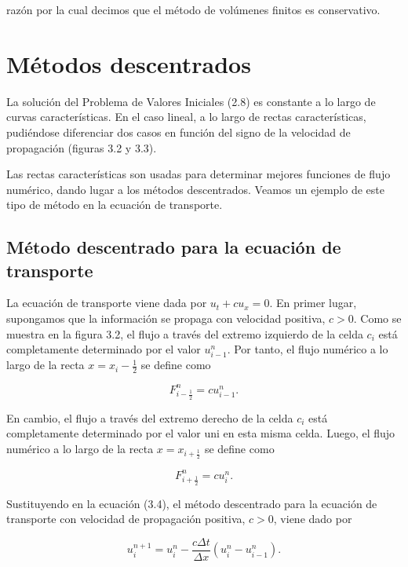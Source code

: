 razón por la cual decimos que el método de volúmenes finitos es
conservativo.

\section{Métodos descentrados}

La solución del Problema de Valores Iniciales (2.8) es constante a lo
largo de curvas características.
En el caso lineal, a lo largo de rectas características, pudiéndose
diferenciar dos casos en función del signo de la velocidad de
propagación (figuras 3.2 y 3.3).


Las rectas características son usadas para determinar mejores
funciones de flujo numérico, dando lugar a los métodos descentrados.
Veamos un ejemplo de este tipo de método en la ecuación de
transporte.

\subsection*{Método descentrado para la ecuación de transporte}

La ecuación de transporte viene dada por $u_{t}+cu_{x}=0$.
En primer lugar, supongamos que la información se propaga con
velocidad positiva, $c>0$.
Como se muestra en la figura 3.2, el flujo a través del extremo
izquierdo de la celda $c_{i}$ está completamente determinado por el
valor $u^{n}_{i-1}$.
Por tanto, el flujo numérico a lo largo de la recta
$x=x_{i}-\frac{1}{2}$ se define como

\begin{equation*}
  F^{n}_{i-\frac{1}{2}}=
  cu^{n}_{i-1}.
\end{equation*}

En cambio, el flujo a través del extremo derecho de la celda $c_{i}$
está completamente determinado por el valor uni en esta misma celda.
Luego, el flujo numérico a lo largo de la recta $x=x_{i+\frac{1}{2}}$
se define como

\begin{equation*}
  F^{n}_{i+\frac{1}{2}}=
  cu^{n}_{i}.
\end{equation*}

Sustituyendo en la ecuación (3.4), el método descentrado para la
ecuación de transporte con velocidad de propagación positiva, $c>0$,
viene dado por

\begin{equation*}
  u^{n+1}_{i}=
  u^{n}_{i}-
  \frac{c\Delta t}{\Delta x}
  \left(
  u^{n}_{i}-
  u^{n}_{i-1}
  \right).
\end{equation*}

